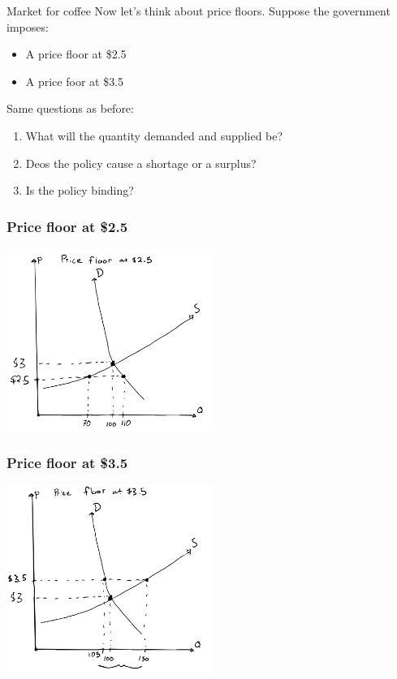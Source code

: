 \documentclass[aspectratio=169]{beamer}
\begin{document}
\begin{frame}{Market for coffee}
    Now let's think about price floors. Suppose the government imposes:
    \begin{itemize}
        \item A price floor at \$2.5
        \item A price foor at \$3.5
    \end{itemize}

    \vspace{5mm}

    Same questions as before:
    \begin{enumerate}
        \item What will the quantity demanded and supplied be?
        \item Deos the policy cause a shortage or a surplus?
        \item Is the policy binding?
    \end{enumerate}
\end{frame}

\begin{frame}
    \frametitle{Price floor at \$2.5}
    \centering
    \includegraphics[width = 0.5\textwidth,keepaspectratio]{coffee_floor_250.png}
\end{frame}

\begin{frame}
    \frametitle{Price floor at \$3.5}
    \centering
    \includegraphics[width = 0.5\textwidth,keepaspectratio]{coffee_floor_350.png}
\end{frame}
\end{document}
